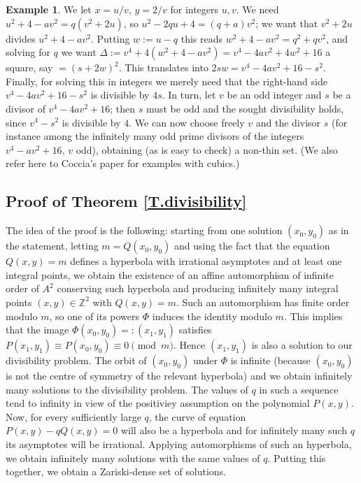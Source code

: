 \documentclass[leqno,12pt]{article} %
\def\Z{{{\mathbb Z}}}
\theoremstyle{plain} %
\theoremstyle{definition} %
\newtheorem{example}[theorem]{\indent\sc Example}
\begin{document}
\begin{example}
We let $x=u/v$, $y=2/v$ for integers $u,v$. We need $u^2+4-av^2=q(v^2+2u)$, so 
$u^2-2qu+4=(q+a)v^2$; we want that $v^2+2u$ divides $u^2+4-av^2$. Putting $w:=u-q$  this reads $w^2+4-av^2=q^2+qv^2$, and solving for $q$ we want 
$\Delta:=v^4+4(w^2+4-av^2)=v^4-4av^2+4w^2+16$ a square, say $=(s+2w)^2$.  This translates into $2sw=v^4-4av^2+16-s^2$. Finally, for solving this in integers we merely need that the right-hand  side $v^4-4av^2+16-s^2$ is divisible by $4s$. In turn, let $v$ be an odd integer and $s$ be a divisor of $v^4-4av^2+16$; then  $s$ must be odd and the sought divisibility holds, since $v^4-s^2$ is divisible by $4$. We can now choose freely $v$ and the divisor $s$ (for instance among the infinitely many odd prime divisors of the integers $v^4-av^2+16$, $v$ odd), obtaining (as is easy to check) a non-thin set.  (We also refer here to {\sc Coccia}'s paper \cite{Coccia} for examples with cubics.)
 \end{example}
 
 
  

\subsection{Proof of Theorem \ref{T.divisibility}} 
 
The idea of the proof is the following: starting from one solution $(x_0,y_0)$ as in the statement, letting $m=Q(x_0,y_0)$ and using the fact that the equation $Q(x,y)=m$ defines a hyperbola with irrational asymptotes and at least one integral points, we obtain the existence of an affine automorphism of infinite order of $A^2$ conserving such hyperbola and producing infinitely many integral points $(x,y)\in \Z^2$  with $Q(x,y)=m$. Such an automorphism has finite order modulo $m$, so one of its powers $\Phi$ induces the identity modulo $m$. This implies that the image $\Phi(x_0,y_0)=:(x_1,y_1)$ satisfies $P(x_1,y_1)\equiv P(x_0,y_0)\equiv 0 \pmod m$. Hence $(x_1,y_1)$ is also a solution to our divisibility problem. The orbit of $(x_0,y_0)$ under  $\Phi$ is infinite (because $(x_0,y_0)$ is not the centre of symmetry of the relevant hyperbola) and we obtain infinitely many solutions to the divisibility problem. The values of $q$ in such a sequence tend to infinity in view of the positiviey assumption  on the polynomial $P(x,y)$. Now, for every sufficiently large $q$, the curve of equation $P(x,y)-qQ(x,y)=0$ will also be a hyperbola and for infinitely many such $q$ its asymptotes will be irrational. Applying automorphisms of such an hyperbola, we obtain infinitely many solutions with the same values of $q$. Putting this together, we obtain a Zariski-dense set of solutions.
\end{document}
